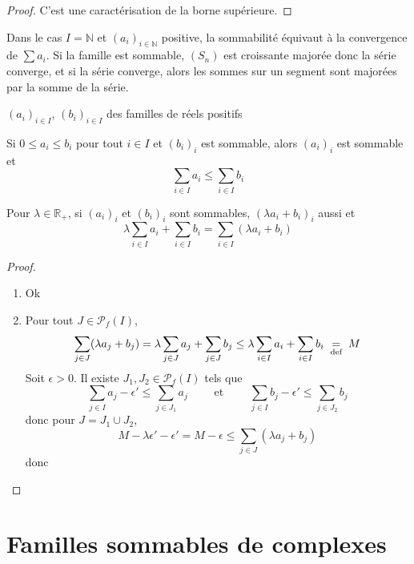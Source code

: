\begin{proof}
    C'est une caractérisation de la borne supérieure.
\end{proof}

\begin{rem}
    Dans le cas $I=\mathbb N$ et $(a_i)_{i\in\mathbb N}$ positive, la sommabilité équivaut à la convergence de $\sum a_i$. Si la famille est sommable, $(S_n)$ est croissante majorée donc la série converge, et si la série converge, alors les sommes sur un segment sont majorées par la somme de la série.
\end{rem}

\begin{prop}
    \Hyp $(a_i)_{i\in I}$, $(b_i)_{i\in I}$ des familles de réels positifs
    \begin{concenum}
    \item Si $0\leq a_i\leq b_i$ pour tout $i\in I$ et $(b_i)_i$ est sommable, alors $(a_i)_i$ est sommable et \[
            \sum_{i\in I}a_i\leq \sum_{i\in I}b_i
        \]
    \item Pour $\lambda\in\mathbb R_+$, si $(a_i)_i$ et $(b_i)_i$ sont sommables, $(\lambda a_i+b_i)_i$ aussi et \[
            \lambda\sum_{i\in I}a_i+\sum_{i\in I}b_i=\sum_{i\in I}(\lambda a_i+b_i)
        \]
    \end{concenum}
\end{prop}

\begin{proof}~
    \begin{enumerate}
        \item Ok
        \item Pour tout $J\in \mathcal P_f(I)$, \[
                \sum_{j\in J}(\lambda a_j+b_j)=\lambda\sum_{j\in J}a_j+\sum_{j\in J}b_j\leq \lambda \sum_{i\in I}a_i+\sum_{i\in I}b_i\;\underset{\text{def}}=\; M
            \]
            Soit $\epsilon>0$. Il existe $J_1, J_2\in\mathcal P_f(I)$ tels que \[
                \sum_{j\in I}a_j-\epsilon'\leq \sum_{j\in J_1}a_j\qquad \text{ et }\qquad \sum_{j\in I}b_j-\epsilon'\leq \sum_{j\in J_2}b_j
            \]
            donc pour $J=J_1\cup J_2$, \[
                M-\lambda\epsilon'-\epsilon'=M-\epsilon\leq \sum_{j\in J}(\lambda a_j+b_j)
            \]
            donc \conc
    \end{enumerate}
\end{proof}

\section{Familles sommables de complexes}

